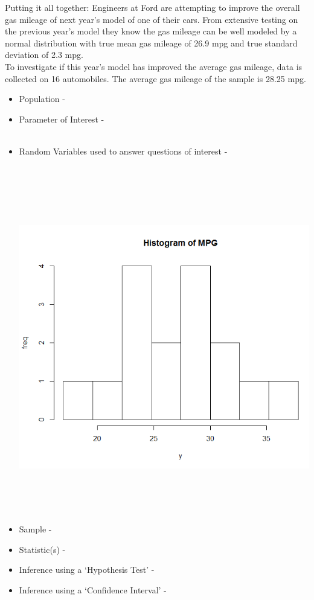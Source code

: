 Putting it all together: Engineers at Ford are attempting to improve the overall gas mileage of next year's model of one of their cars.  From extensive testing on the previous year's model they know the gas mileage can be well modeled by a normal distribution with true mean gas mileage of 26.9 mpg and true standard deviation of 2.3 mpg.\\
To investigate if this year's model has improved the average gas mileage, data is collected on 16 automobiles.   The average gas mileage of the sample is 28.25 mpg.
\begin{itemize}
\item Population - \\
\item Parameter of Interest -\\~\\
\item Random Variables used to answer questions of interest - \\~\\~\\~\\~\\~\\
\begin{flushleft}
\includegraphics[scale=0.5]{mpg}
\end{flushleft}~\\~\\~\\
\item Sample - \\
\item Statistic(s) - \\

\newpage

\item Inference using a `Hypothesis Test' -

\newpage

\item Inference using a `Confidence Interval' - 
\end{itemize}

